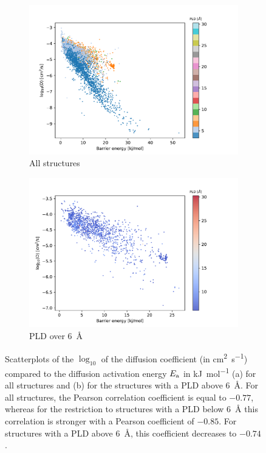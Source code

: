 \documentclass[main]{subfiles}
\begin{document}
\begin{figure}[ht]
  \centering
  \begin{subfigure}[b]{0.48\textwidth}
    \centering
    \includegraphics[width=\textwidth]{figures/5-diffusion/difflog_barrier_Df_uff.pdf}
    \caption{All structures}\label{fgr:barrier_diffusion_a}
\end{subfigure}
  \hfill
  \begin{subfigure}[b]{0.48\textwidth}
      \centering
      \includegraphics[width=\textwidth]{figures/5-diffusion/difflog_barrier_Df_uff_2.pdf}
      \caption{PLD over \SI{6}{\angstrom}}\label{fgr:barrier_diffusion_b}
  \end{subfigure}
    \caption{ Scatterplots of the $\log_{10}$ of the diffusion coefficient (in \si{\square\cm\per\s}) compared to the diffusion activation energy $E_{\text{a}}$ in \si{\kJ\per\mol} (a) for all structures  and (b) for the structures with a PLD above \SI{6}{\angstrom}. For all structures, the Pearson correlation coefficient is equal to $-0.77$, whereas for the restriction to structures with a PLD below \SI{6}{\angstrom} this correlation is stronger with a Pearson coefficient of $-0.85$. For structures with a PLD above \SI{6}{\angstrom}, this coefficient decreases to $-0.74$.}\label{fgr:barrier_diffusion}
\end{figure}
\end{document}
